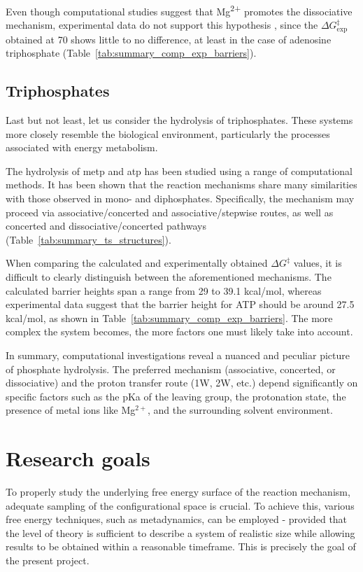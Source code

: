 Even though computational studies suggest that Mg\textsuperscript{2+} promotes the dissociative mechanism, experimental data do not support this hypothesis \citep{ramirezMagnesiumCalciumIon1980}, since the $\Delta G^{\ddagger}_{\text{exp}}$ obtained at 70 shows little to no difference, at least in the case of adenosine triphosphate (Table~\ref{tab:summary_comp_exp_barriers}).



\subsection{Triphosphates}
Last but not least, let us consider the hydrolysis of triphosphates. These systems more closely resemble the biological environment, particularly the processes associated with energy metabolism.

The hydrolysis of \ac{metp} and \ac{atp} has been studied using a range of computational methods. It has been shown that the reaction mechanisms share many similarities with those observed in mono- and diphosphates. Specifically, the mechanism may proceed via associative/concerted and associative/stepwise routes, as well as concerted and dissociative/concerted pathways (Table~\ref{tab:summary_ts_structures}). 

When comparing the calculated and experimentally obtained $\Delta G^{\ddagger}$ values, it is difficult to clearly distinguish between the aforementioned mechanisms. The calculated barrier heights span a range from 29 to 39.1 kcal/mol, whereas experimental data suggest that the barrier height for ATP should be around 27.5 kcal/mol, as shown in Table~\ref{tab:summary_comp_exp_barriers}. The more complex the system becomes, the more factors one must likely take into account.

In summary, computational investigations reveal a nuanced and peculiar picture of phosphate hydrolysis. The preferred mechanism (associative, concerted, or dissociative) and the proton transfer route (1W, 2W, etc.) depend significantly on specific factors such as the pKa of the leaving group, the protonation state, the presence of metal ions like Mg$^{2+}$, and the surrounding solvent environment. 



\section{Research goals}

To properly study the underlying free energy surface of the reaction mechanism, adequate sampling of the configurational space is crucial. To achieve this, various free energy techniques, such as metadynamics, can be employed - provided that the level of theory is sufficient to describe a system of realistic size while allowing results to be obtained within a reasonable timeframe. This is precisely the goal of the present project.

